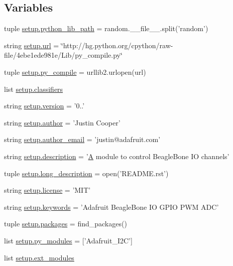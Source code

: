 \subsection*{Variables}
\begin{DoxyCompactItemize}
\item 
tuple \hyperlink{namespacesetup_a89608c7a8493cb22c84ae7556e376641}{setup.\+python\+\_\+lib\+\_\+path} = random.\+\_\+\+\_\+file\+\_\+\+\_\+.\+split('random')
\item 
string \hyperlink{namespacesetup_a7c3763764f99123690822c047e74c36e}{setup.\+url} = \char`\"{}http\+://hg.\+python.\+org/cpython/raw-\/file/4ebe1ede981e/\+Lib/py\+\_\+compile.\+py\char`\"{}
\item 
tuple \hyperlink{namespacesetup_a2a5ed1c7cbf3afaf6894e1b1b6e2602e}{setup.\+py\+\_\+compile} = urllib2.\+urlopen(url)
\item 
list \hyperlink{namespacesetup_aa6d1b3ef82314b74854a1a1a473aadbf}{setup.\+classifiers}
\item 
string \hyperlink{namespacesetup_a8b86ddd5b5591d99de08e584197a53d9}{setup.\+version} = '0..'
\item 
string \hyperlink{namespacesetup_a7b92894168460f935bc49467954c4a92}{setup.\+author} = 'Justin Cooper'
\item 
string \hyperlink{namespacesetup_a4ead8e1ca45242906fde7d5489f3beaa}{setup.\+author\+\_\+email} = 'justin@adafruit.\+com'
\item 
string \hyperlink{namespacesetup_a4ad612547892c74be7035043265eb65c}{setup.\+description} = '\hyperlink{classA}{A} module to control Beagle\+Bone I\+O channels'
\item 
tuple \hyperlink{namespacesetup_a2e8655c91c2658305ee0ee4c023d59eb}{setup.\+long\+\_\+description} = open('R\+E\+A\+D\+M\+E.\+rst')
\item 
string \hyperlink{namespacesetup_a22ada03d1aaa82c1c9c27d0ae25da2b7}{setup.\+license} = 'M\+I\+T'
\item 
string \hyperlink{namespacesetup_a97e6300ec1966f2580ee08f1f55e2f46}{setup.\+keywords} = 'Adafruit Beagle\+Bone I\+O G\+P\+I\+O P\+W\+M A\+D\+C'
\item 
tuple \hyperlink{namespacesetup_a61c4df0a151113447498726d453324de}{setup.\+packages} = find\+\_\+packages()
\item 
list \hyperlink{namespacesetup_a2f17d3b44c4dab5ffba788f40bf1397a}{setup.\+py\+\_\+modules} = \mbox{[}'Adafruit\+\_\+\+I2\+C'\mbox{]}
\item 
list \hyperlink{namespacesetup_a75e1b9b094c785fb1fabf9342f43ee73}{setup.\+ext\+\_\+modules}
\end{DoxyCompactItemize}
